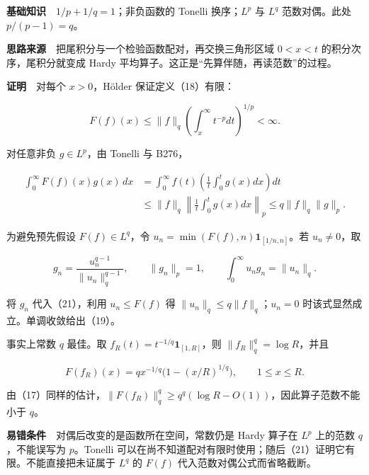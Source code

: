 \documentclass[11pt,a4paper]{article}
\begin{document}
\textbf{基础知识}　\(1/p+1/q=1\)；非负函数的 Tonelli 换序；\(L^p\) 与
\(L^q\) 范数对偶。此处 \(p/(p-1)=q\)。

\textbf{思路来源}　把尾积分与一个检验函数配对，再交换三角形区域
\(0<x<t\) 的积分次序，尾积分就变成 Hardy
平均算子。这正是``先算伴随，再读范数''的过程。

\textbf{证明}　对每个 \(x>0\)，Hölder 保证定义（18）有限：

\begin{equation}
F(f)(x)\le\|f\|_q
\left(\int_x^\infty t^{-p}dt\right)^{1/p}<\infty.
\tag{20}
\end{equation}

对任意非负 \(g\in L^p\)，由 Tonelli 与 B276，

\begin{equation}
\begin{aligned}
\int_0^\infty F(f)(x)g(x)\,dx
&=\int_0^\infty f(t)\left(\frac1t\int_0^t g(x)dx\right)dt\\
&\le\|f\|_q\left\|\frac1t\int_0^t g(x)dx\right\|_p
\le q\|f\|_q\|g\|_p.
\end{aligned}
\tag{21}
\end{equation}

为避免预先假设 \(F(f)\in L^q\)，令
\(u_n=\min(F(f),n)\mathbf1_{[1/n,n]}\)。若 \(u_n\ne0\)，取

\begin{equation}
g_n=\frac{u_n^{q-1}}{\|u_n\|_q^{q-1}},
\qquad \|g_n\|_p=1,
\qquad \int_0^\infty u_ng_n=\|u_n\|_q.
\tag{22}
\end{equation}

将 \(g_n\) 代入（21），利用 \(u_n\le F(f)\) 得
\(\|u_n\|_q\le q\|f\|_q\)；\(u_n=0\)
时该式显然成立。单调收敛给出（19）。

事实上常数 \(q\) 最佳。取 \(f_R(t)=t^{-1/q}\mathbf1_{[1,R]}\)，则
\(\|f_R\|_q^q=\log R\)，并且

\begin{equation}
F(f_R)(x)=q x^{-1/q}\bigl(1-(x/R)^{1/q}\bigr),
\qquad1\le x\le R.
\tag{23}
\end{equation}

由（17）同样的估计，\(\|F(f_R)\|_q^q\ge q^q(\log R-O(1))\)，因此算子范数不能小于
\(q\)。

\textbf{易错条件}　对偶后改变的是函数所在空间，常数仍是 Hardy 算子在
\(L^p\) 上的范数 \(q\)，不能误写为 \(p\)。Tonelli
可以在尚不知道配对有限时使用；随后（21）证明它有限。不能直接把未证属于
\(L^q\) 的 \(F(f)\) 代入范数对偶公式而省略截断。
\end{document}
